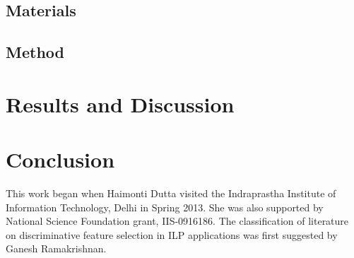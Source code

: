 \subsection{Materials}
\label{sec:exptmat}

\subsection{Method}
\label{sec:exptmeth}






\section{Results and Discussion}



\section{Conclusion}
\begin{acknowledgements}
This work began when Haimonti Dutta visited the Indraprastha Institute of Information Technology, Delhi in Spring 2013. She was also supported by National Science Foundation grant, IIS-0916186. The classification of literature on discriminative feature selection in ILP applications was first suggested by Ganesh Ramakrishnan.
\end{acknowledgements}

